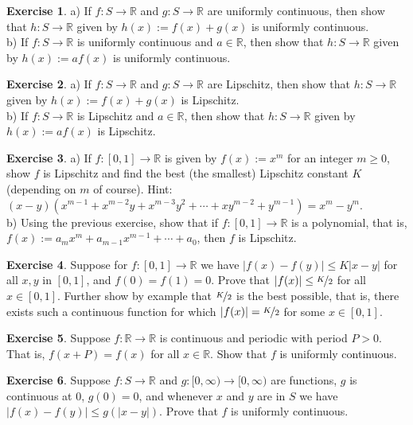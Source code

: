 \documentclass[12pt]{book}
\newcommand{\abs}[1]{\left\lvert {#1} \right\rvert}
\newcommand{\R}{{\mathbb{R}}}
\theoremstyle{plain}
\theoremstyle{remark}
\theoremstyle{definition}
\theoremstyle{exercise}
\newtheorem{exercise}{Exercise}[section]
\theoremstyle{example}
\begin{document}
\begin{exercise}
a) If $f \colon S \to \R$ and $g \colon S \to \R$ are uniformly continuous,
then show that $h \colon S \to \R$ given by $h(x) := f(x) + g(x)$
is uniformly continuous.\\
b) If $f \colon S \to \R$ is uniformly continuous and $a \in \R$,
then show that $h \colon S \to \R$ given by $h(x) := a f(x)$
is uniformly continuous.
\end{exercise}

\begin{exercise}
a) If $f \colon S \to \R$ and $g \colon S \to \R$ are Lipschitz,
then show that $h \colon S \to \R$ given by $h(x) := f(x) + g(x)$
is Lipschitz.\\
b) If $f \colon S \to \R$ is Lipschitz and $a \in \R$,
then show that $h \colon S \to \R$ given by $h(x) := a f(x)$
is Lipschitz.
\end{exercise}

\begin{exercise}
a) If $f \colon [0,1] \to \R$ is given by $f(x) := x^m$ for an integer
$m \geq 0$,
show $f$ is Lipschitz and find the best (the smallest) Lipschitz constant
$K$ (depending on $m$ of course).
Hint: $(x-y)(x^{m-1} + x^{m-2}y + x^{m-3}y^2 + \cdots + x y^{m-2} + y^{m-1}) = x^m - y^m$.
\\
b) Using the previous exercise, show that if $f \colon [0,1] \to \R$
is a polynomial, that is, $f(x) := a_m x^m + a_{m-1} x^{m-1} + \cdots + a_0$,
then $f$ is Lipschitz.
\end{exercise}

\begin{exercise}
Suppose for $f \colon [0,1] \to \R$ we have $\abs{f(x)-f(y)} \leq K
\abs{x-y}$ for all $x,y$ in $[0,1]$,
and $f(0) = f(1) = 0$.
Prove that $\abs{f(x)} \leq \nicefrac{K}{2}$ for all $x \in [0,1]$.  Further show by example that
$\nicefrac{K}{2}$ is the best possible, that is, there exists such a continuous function
for which $\abs{f(x)} = \nicefrac{K}{2}$ for some $x \in [0,1]$.
\end{exercise}

\begin{exercise}
Suppose $f \colon \R \to \R$ is continuous and periodic with period
$P > 0$.  That is, $f(x+P) = f(x)$ for all $x \in \R$.  Show that $f$
is uniformly continuous.
\end{exercise}

\begin{exercise}
Suppose $f \colon S \to \R$ and $g \colon [0,\infty) \to [0,\infty)$
are functions, $g$ is continuous at $0$, $g(0) = 0$, and
whenever $x$ and $y$ are in $S$ we have $\abs{f(x)-f(y)} \leq g(\abs{x-y})$.
Prove that $f$ is uniformly continuous.
\end{exercise}
\end{document}
